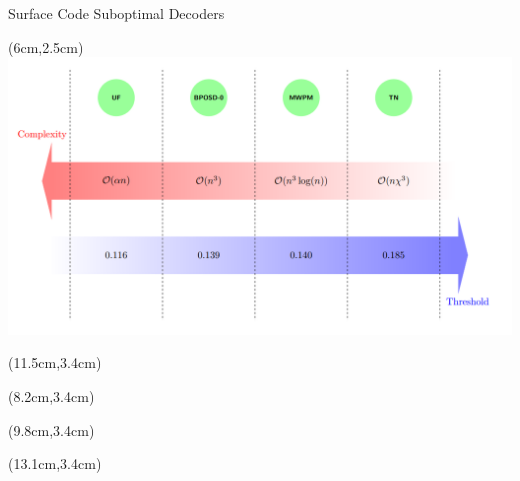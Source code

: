 \documentclass{dfki}
\begin{document}
\begin{frame}{Surface Code Suboptimal Decoders}
	\begin{textblock*}{9cm}(6cm,2.5cm)
        \includegraphics[width=1\textwidth]{fig/Screenshot from 2025-03-24 15-21-55.png}
    \end{textblock*}
	\begin{textblock*}{2cm}(11.5cm,3.4cm)
		\begin{tiny}
			\cite{edmonds_paths_1965}
		\end{tiny}
	\end{textblock*}
	\begin{textblock*}{2cm}(8.2cm,3.4cm)
		\begin{tiny}
			\cite{delfosse_almost-linear_2021}
		\end{tiny}
	\end{textblock*}
	\begin{textblock*}{2cm}(9.8cm,3.4cm)
		\begin{tiny}
			\cite{panteleev_degenerate_2021}
		\end{tiny}
	\end{textblock*}
	\begin{textblock*}{2cm}(13.1cm,3.4cm)
		\begin{tiny}
			\cite{bravyi_efficient_2014,chubb_general_2021}
		\end{tiny}
	\end{textblock*}
\end{frame}
\end{document}
